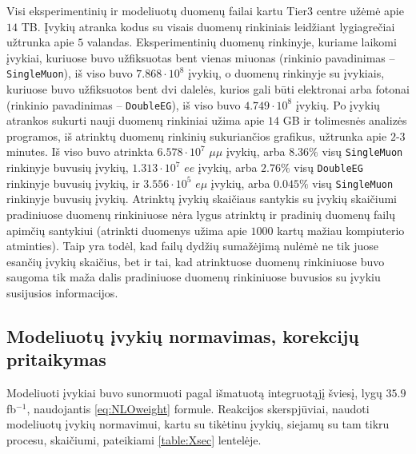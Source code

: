 \documentclass[a4paper, 12pt]{article}
\newcommand{\ttt}[1]{\texttt{#1}}
\newcommand{\emu}{e\mu}
\newcommand{\mumu}{\mu\mu}
\newcommand{\invfb}{fb$^{-1}$}
\newlength\q
\begin{document}
Visi eksperimentinių ir modeliuotų duomenų failai kartu Tier3 centre užėmė apie $14$ TB.
Įvykių atranka kodus su visais duomenų rinkiniais leidžiant lygiagrečiai užtrunka apie $5$ valandas.
Eksperimentinių duomenų rinkinyje, kuriame laikomi įvykiai, kuriuose buvo užfiksuotas bent vienas miuonas
(rinkinio pavadinimas -- \ttt{SingleMuon}), iš viso buvo $7.868 \cdot 10^8$ įvykių, o duomenų rinkinyje su įvykiais,
kuriuose buvo užfiksuotos bent dvi dalelės, kurios gali būti elektronai arba fotonai (rinkinio pavadinimas --
\ttt{DoubleEG}), iš viso buvo $4.749 \cdot 10^8$ įvykių.
Po įvykių atrankos sukurti nauji duomenų rinkiniai užima apie $14$ GB ir tolimesnės analizės programos, iš atrinktų
duomenų rinkinių sukuriančios grafikus, užtrunka apie $2$-$3$ minutes.
Iš viso buvo atrinkta $6.578 \cdot 10^7$ $\mumu$ įvykių, arba $8.36\%$ visų \ttt{SingleMuon} rinkinyje buvusių įvykių,
$1.313 \cdot 10^7$ $ee$ įvykių, arba $2.76\%$ visų \ttt{DoubleEG} rinkinyje buvusių įvykių, ir $3.556 \cdot 10^5$
$\emu$ įvykių, arba $0.045\%$ visų \ttt{SingleMuon} rinkinyje buvusių įvykių.
Atrinktų įvykių skaičiaus santykis su įvykių skaičiumi pradiniuose duomenų rinkiniuose nėra lygus atrinktų ir pradinių
duomenų failų apimčių santykiui (atrinkti duomenys užima apie $1000$ kartų mažiau kompiuterio atminties).
Taip yra todėl, kad failų dydžių sumažėjimą nulėmė ne tik juose esančių įvykių skaičius, bet ir tai, kad atrinktuose
duomenų rinkiniuose buvo saugoma tik maža dalis pradiniuose duomenų rinkiniuose buvusios su įvykiu susijusios
informacijos.

\subsection{Modeliuotų įvykių normavimas, korekcijų pritaikymas} \label{sec:ppResults}

Modeliuoti įvykiai buvo sunormuoti pagal išmatuotą integruotąjį šviesį, lygų $35.9$ \invfb, naudojantis \eqref{eq:NLOweight}
formule.
Reakcijos skerspjūviai, naudoti modeliuotų įvykių normavimui, kartu su tikėtinu įvykių, siejamų su tam tikru procesu,
skaičiumi, pateikiami \ref{table:Xsec} lentelėje.

\end{document}
